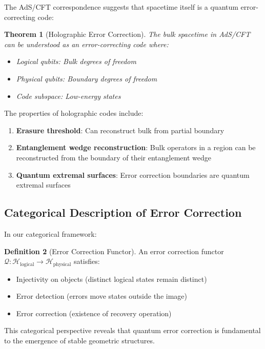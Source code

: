 \documentclass[12pt,a4paper]{article}
\newcommand{\cat}[1]{\mathcal{#1}}
\newcommand{\qec}{\mathcal{Q}}
\theoremstyle{plain}
\newtheorem{theorem}{Theorem}[section]
\theoremstyle{definition}
\newtheorem{definition}[theorem]{Definition}
\theoremstyle{remark}
\begin{document}
The AdS/CFT correspondence suggests that spacetime itself is a quantum error-correcting code:

\begin{theorem}[Holographic Error Correction]
The bulk spacetime in AdS/CFT can be understood as an error-correcting code where:
\begin{itemize}
\item Logical qubits: Bulk degrees of freedom
\item Physical qubits: Boundary degrees of freedom
\item Code subspace: Low-energy states
\end{itemize}
\end{theorem}

The properties of holographic codes include:
\begin{enumerate}
\item \textbf{Erasure threshold}: Can reconstruct bulk from partial boundary
\item \textbf{Entanglement wedge reconstruction}: Bulk operators in a region can be reconstructed from the boundary of their entanglement wedge
\item \textbf{Quantum extremal surfaces}: Error correction boundaries are quantum extremal surfaces
\end{enumerate}

\subsection{Categorical Description of Error Correction}

In our categorical framework:

\begin{definition}[Error Correction Functor]
An error correction functor $\qec: \cat{H}_{\text{logical}} \to \cat{H}_{\text{physical}}$ satisfies:
\begin{itemize}
\item Injectivity on objects (distinct logical states remain distinct)
\item Error detection (errors move states outside the image)
\item Error correction (existence of recovery operation)
\end{itemize}
\end{definition}

This categorical perspective reveals that quantum error correction is fundamental to the emergence of stable geometric structures.
\end{document}
